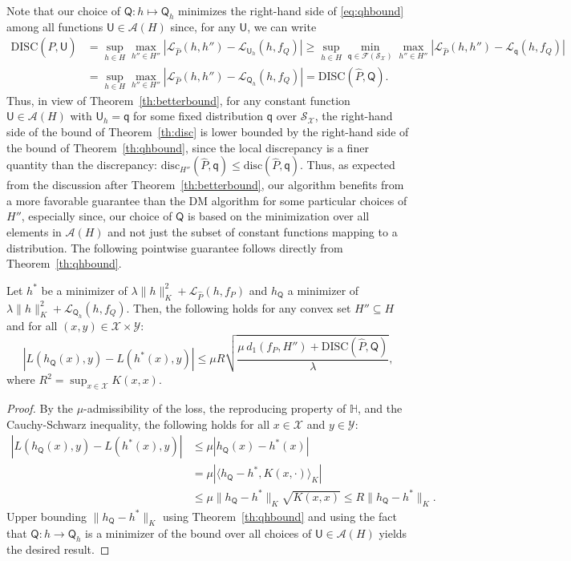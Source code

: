 \documentclass[twoside,11pt]{article}
\def\Hset{\mathbb{H}}
\providecommand{\norm}[2]{\lVert#1\rVert_{#2}}
\newcommand{\h}{\widehat}
\newcommand{\cA}{{\mathcal A}}
\newcommand{\cF}{{\mathcal F}}
\newcommand{\cL}{{\mathcal L}}
\newcommand{\cS}{{\mathcal S}}
\newcommand{\cX}{{\mathcal X}}
\newcommand{\cY}{{\mathcal Y}}
\newcommand{\1}{\mat{1}}
\newcommand{\qq}{{\mathsf q}}
\newcommand{\QQ}{{\mathsf Q}}
\newcommand{\UU}{{\mathsf U}}
\newcommand{\dis}{\mathrm{disc}}
\newcommand{\DIS}{\mathrm{DISC}}
\newcommand{\done}{d_1}
\begin{document}
Note that our choice of $\QQ\colon h \mapsto \QQ_h$ minimizes the
right-hand side of \eqref{eq:qhbound} among all functions
$\UU \in \cA(H)$ since, for any $\UU$, we can write
\begin{align*}
 \DIS(\h P, \UU)
& \!=\!  \sup_{h \in H} \max_{h'' \in H''} \! | \cL_{\h P}(h,
 h'')  \!-\! \cL_{\UU_h}(h, f_Q)|
\!\geq\! \sup_{h \in H} \min_{\qq \in
   \cF(\cS_\cX)} \max_{h'' \in H''} | \cL_{\h P}(h, h'') \!-\!
 \cL_{\qq}(h, f_Q) | \\
& \!=\! \sup_{h \in H} \max_{h'' \in H''} | \cL_{\h P}(h, h'') -
\cL_{\QQ_h}(h, f_Q)| = \DIS(\h P, \QQ).
\end{align*}
Thus, in view of Theorem~\ref{th:betterbound}, for any constant
function $\UU \in \cA(H)$ with $\UU_h = \qq$ for some fixed
distribution $\qq$ over $\cS_\cX$, the right-hand side of the bound of
Theorem~\ref{th:disc} is lower bounded by the right-hand side of the
bound of Theorem~\ref{th:qhbound}, since the local discrepancy is a
finer quantity than the discrepancy:
$\dis_{H''}(\h P , \qq) \leq \dis(\h P , \qq)$. Thus, as expected from
the discussion after Theorem~\ref{th:betterbound}, our algorithm
benefits from a more favorable guarantee than the DM algorithm for
some particular choices of $H''$, especially since, our choice of
$\QQ$ is based on the minimization over all elements in $\cA(H)$ and
not just the subset of constant functions mapping to a
distribution. The following pointwise guarantee follows directly from
Theorem~\ref{th:qhbound}.

\begin{corollary}
\label{coro:pointwise1}
Let $h^*$ be a minimizer of
$\lambda \norm{h}{K}^2 + \cL_{\h P}(h,f_P)$ and $h_\QQ$ a minimizer of
$\lambda \norm{h}{K}^2 +\cL_{\QQ_h}(h, f_Q)$. Then, the following
holds for any convex set
$H'' \subseteq H$ and for all $(x,y) \in \cX \times\cY$:
\begin{equation}
|L(h_\QQ(x), y) - L(h^*(x), y)|
\leq \mu R \sqrt{\frac{\mu \, \done(f_P, H'') +
\DIS(\h P, \QQ)}{\lambda}},
\end{equation}
where $R^2 = \sup_{x \in \cX} K(x, x)$.
\end{corollary}

\begin{proof}
  By the $\mu$-admissibility of the loss, the reproducing property of
$\Hset$, and the Cauchy-Schwarz inequality, the following holds for
all $x \in \cX$ and $y \in \cY$:
\begin{align*}
|L(h_\QQ(x), y) - L(h^*(x), y)|
& \leq \mu |h_\QQ(x) - h^*(x)| \\
& = \mu |\langle h_\QQ - h^*, K(x, \cdot) \rangle_K| \\
&\leq \mu \|h_\QQ - h^*\|_K \sqrt{K(x, x)} \leq R \|h_\QQ - h^*\|_K.
\end{align*}
Upper bounding $\|h_\QQ - h^*\|_K$ using
Theorem~\ref{th:qhbound} and using the fact that $\QQ\colon h \to \QQ_h$ is
a minimizer of the bound over all choices of $\UU \in \cA(H)$ yields
the desired result.
\end{proof}
\end{document}
